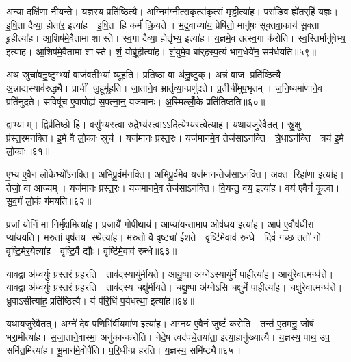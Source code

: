 अ॒न्या दक्षि॑णा नीयन्ते।
य॒ज्ञस्य॒ प्रति॑ष्ठित्यै।
अ॒ग्निम॑ग्नीत्स॒कृत्स॑कृ॒त्सं मृ॒ड्ढीत्या॑ह।
परा॑ङिव॒ ह्ये॑तर्‌हि॑ य॒ज्ञः।
इ॒षि॒ता दैव्या॒ होता॑र॒ इत्या॑ह।
इ॒षि॒त हि कर्म॑ क्रि॒यते।
भ॒द्र॒वाच्या॑य॒ प्रेषि॑तो॒ मानु॑षः सूक्तवा॒काय॑ सू॒क्ता ब्रू॒हीत्या॑ह।
आ॒शिष॑मे॒वैतामा शास्ते।
स्व॒गा दैव्या॒ होतृ॑भ्य॒ इत्या॑ह।
य॒ज्ञमे॒व तत्स्व॒गा क॑रोति।
स्व॒स्तिर्मानु॑षेभ्य॒ इत्या॑ह।
आ॒शिष॑मे॒वैतामा शास्ते।
शं॒ योर्ब्रू॒हीत्या॑ह।
शं॒युमे॒व बा॑र्‌हस्प॒त्यं भा॑ग॒धेये॑न॒ सम॑र्धयति॥५९॥\anuvakamend[च॒र॒त्य॒ध्व॒र्युः प्रजा॑तिर्ह्वयते॒ वेदाब्रवीद्बर्‌हि॒षदं॑ करोत्यृ॒त्विजो॑ दधाति ब्र॒ह्माऽनु॑करोति च॒त्वारि॑ च]

अथ॒ स्रुचा॑वनु॒ष्टुग्भ्यां॒ वाज॑वतीभ्यां॒ व्यू॑हति।
प्र॒ति॒ष्ठा वा अ॑नु॒ष्टुक्।
अन्नं॒ वाज॒ प्रति॑ष्ठित्यै।
अ॒न्नाद्य॒स्याव॑रुद्ध्यै।
प्राचीं जु॒हूमू॑हति।
जा॒ताने॒व भ्रातृ॑व्या॒न्प्रणु॑दते।
प्र॒तीची॑मुप॒भृतम्।
ज॒नि॒ष्यमा॑णाने॒व प्रति॑नुदते।
सविषू॑च ए॒वापोह्य॑ स॒पत्ना॒न्॒ यज॑मानः।
अ॒स्मिल्लोँ॒के प्रति॑तिष्ठति॥६०॥

द्वाभ्याम्।
द्विप्र॑तिष्ठो॒ हि।
वसु॑भ्यस्त्वा रु॒द्रेभ्य॑स्त्वाऽऽदि॒त्येभ्य॒स्त्वेत्या॑ह।
य॒था॒य॒जुरे॒वैतत्।
स्रु॒क्षु प्र॑स्त॒रम॑नक्ति।
इ॒मे वै लो॒काः स्रुच॑।
यज॑मानः प्रस्त॒रः।
यज॑मानमे॒व तेज॑साऽनक्ति।
त्रे॒धाऽन॑क्ति।
त्रय॑ इ॒मे लो॒काः॥६१॥

ए॒भ्य ए॒वैनं॑ लो॒केभ्यो॑ऽनक्ति।
अ॒भि॒पू॒र्वम॑नक्ति।
अ॒भि॒पू॒र्वमे॒व यज॑मान॒न्तेज॑साऽनक्ति।
अ॒क्त रिहा॑णा॒ इत्या॑ह।
तेजो॒ वा आज्यम्।
यज॑मानः प्रस्त॒रः।
यज॑मानमे॒व तेज॑साऽनक्ति।
वि॒यन्तु॒ वय॒ इत्या॑ह।
वय॑ ए॒वैनं॑ कृ॒त्वा।
सु॒व॒र्गं लो॒कं ग॑मयति॥६२॥

प्र॒जां योनिं॒ मा निर्मृ॑क्ष॒मित्या॑ह।
प्र॒जायै॑ गोपी॒थाय॑।
आप्या॑यन्ता॒माप॒ ओष॑धय॒ इत्या॑ह।
आप॑ ए॒वौष॑धी॒रा प्या॑ययति।
म॒रुतां॒ पृष॑तय॒ स्थेत्या॑ह।
म॒रुतो॒ वै वृष्ट्या॑ ईशते।
वृष्टि॑मे॒वाव॑ रुन्धे।
दिवं॑ गच्छ॒ ततो॑ नो॒ वृष्टि॒मेर॒येत्या॑ह।
वृष्टि॒र्वै द्यौः।
वृष्टि॑मे॒वाव॑ रुन्धे॥६३॥

याव॒द्वा अ॑ध्व॒र्युः प्र॑स्त॒रं प्र॒हर॑ति।
ताव॑द॒स्यायु॑र्मीयते।
आ॒यु॒ष्पा अ॑ग्ने॒ऽस्यायु॑र्मे पा॒हीत्या॑ह।
आयु॑रे॒वात्मन्ध॑त्ते।
याव॒द्वा अ॑ध्व॒र्युः प्र॑स्त॒रं प्र॒हर॑ति।
ताव॑दस्य॒ चक्षु॑र्मीयते।
च॒क्षु॒ष्पा अ॑ग्नेऽसि॒ चक्षु॑र्मे पा॒हीत्या॑ह।
चक्षु॑रे॒वात्मन्ध॑त्ते।
ध्रु॒वाऽसीत्या॑ह॒ प्रति॑ष्ठित्यै।
यं प॑रि॒धिं प॒र्यध॑त्था॒ इत्या॑ह॥६४॥

य॒था॒य॒जुरे॒वैतत्।
अग्ने॑ देव प॒णिभि॑र्वी॒यमा॑ण॒ इत्या॑ह।
अ॒ग्नय॑ ए॒वैनं॒ जुष्टं॑ करोति।
तन्त॑ ए॒तमनु॒ जोषं॑ भरा॒मीत्या॑ह।
स॒जा॒ताने॒वास्मा॒ अनु॑कान्करोति।
नेदे॒ष त्वद॑पचे॒तया॑ता॒ इत्या॒हानु॑ख्यात्यै।
य॒ज्ञस्य॒ पाथ॒ उप॒ समि॑त॒मित्या॑ह।
भू॒मान॑मे॒वोपै॑ति।
प॒रि॒धीन्प्र ह॑रति।
य॒ज्ञस्य॒ समि॑ष्ट्यै॥६५॥

